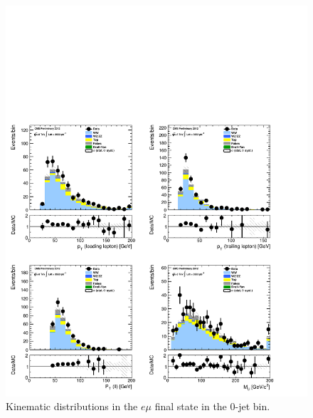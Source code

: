 \begin{figure}[!hbtp]
\centering
\includegraphics[width=1\textwidth]{figures/ww_analysis20_0_ALL_em_0j.pdf}
\caption{Kinematic distributions in the $e\mu$ final state in the 0-jet bin.}
\label{fig:xs_kinematics_em_0j}
\end{figure}
